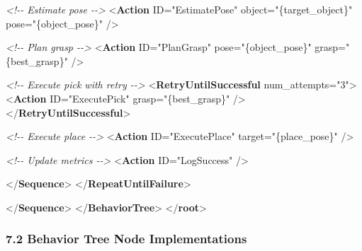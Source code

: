 \documentclass[
]{article}
\newenvironment{Shaded}{\begin{snugshade}}{\end{snugshade}}
\newcommand{\CommentTok}[1]{\textcolor[rgb]{0.56,0.35,0.01}{\textit{#1}}}
\newcommand{\KeywordTok}[1]{\textcolor[rgb]{0.13,0.29,0.53}{\textbf{#1}}}
\newcommand{\NormalTok}[1]{#1}
\newcommand{\OtherTok}[1]{\textcolor[rgb]{0.56,0.35,0.01}{#1}}
\newcommand{\StringTok}[1]{\textcolor[rgb]{0.31,0.60,0.02}{#1}}
\begin{document}
\begin{Shaded}
\begin{Highlighting}[]
                    \CommentTok{\textless{}!{-}{-} Estimate pose {-}{-}\textgreater{}}
\NormalTok{                    \textless{}}\KeywordTok{Action}\OtherTok{ ID=}\StringTok{"EstimatePose"}
\OtherTok{                            object=}\StringTok{"\{target\_object\}"}
\OtherTok{                            pose=}\StringTok{"\{object\_pose\}"}\NormalTok{ /\textgreater{}}

                    \CommentTok{\textless{}!{-}{-} Plan grasp {-}{-}\textgreater{}}
\NormalTok{                    \textless{}}\KeywordTok{Action}\OtherTok{ ID=}\StringTok{"PlanGrasp"}
\OtherTok{                            pose=}\StringTok{"\{object\_pose\}"}
\OtherTok{                            grasp=}\StringTok{"\{best\_grasp\}"}\NormalTok{ /\textgreater{}}

                    \CommentTok{\textless{}!{-}{-} Execute pick with retry {-}{-}\textgreater{}}
\NormalTok{                    \textless{}}\KeywordTok{RetryUntilSuccessful}\OtherTok{ num\_attempts=}\StringTok{"3"}\NormalTok{\textgreater{}}
\NormalTok{                        \textless{}}\KeywordTok{Action}\OtherTok{ ID=}\StringTok{"ExecutePick"}\OtherTok{ grasp=}\StringTok{"\{best\_grasp\}"}\NormalTok{ /\textgreater{}}
\NormalTok{                    \textless{}/}\KeywordTok{RetryUntilSuccessful}\NormalTok{\textgreater{}}

                    \CommentTok{\textless{}!{-}{-} Execute place {-}{-}\textgreater{}}
\NormalTok{                    \textless{}}\KeywordTok{Action}\OtherTok{ ID=}\StringTok{"ExecutePlace"}\OtherTok{ target=}\StringTok{"\{place\_pose\}"}\NormalTok{ /\textgreater{}}

                    \CommentTok{\textless{}!{-}{-} Update metrics {-}{-}\textgreater{}}
\NormalTok{                    \textless{}}\KeywordTok{Action}\OtherTok{ ID=}\StringTok{"LogSuccess"}\NormalTok{ /\textgreater{}}

\NormalTok{                \textless{}/}\KeywordTok{Sequence}\NormalTok{\textgreater{}}
\NormalTok{            \textless{}/}\KeywordTok{RepeatUntilFailure}\NormalTok{\textgreater{}}

\NormalTok{        \textless{}/}\KeywordTok{Sequence}\NormalTok{\textgreater{}}
\NormalTok{    \textless{}/}\KeywordTok{BehaviorTree}\NormalTok{\textgreater{}}
\NormalTok{\textless{}/}\KeywordTok{root}\NormalTok{\textgreater{}}
\end{Highlighting}
\end{Shaded}

\hypertarget{behavior-tree-node-implementations}{%
\subsubsection{7.2 Behavior Tree Node
Implementations}\label{behavior-tree-node-implementations}}
\end{document}
